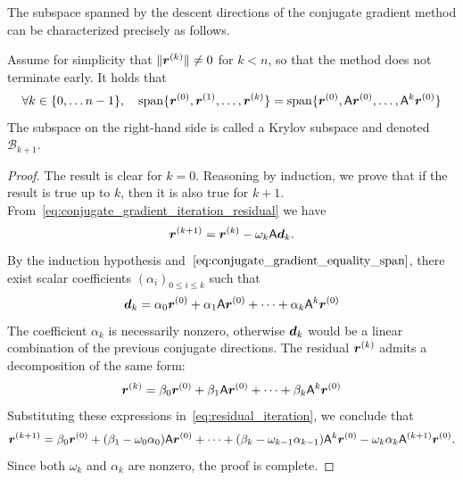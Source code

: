 The subspace spanned by the descent directions of the conjugate gradient method can be characterized precisely as follows.

\begin{proposition}
    \label{proposition:krylov_subspace}
    Assume for simplicity that $\lVert\mathbf{\boldsymbol{r}}^{(k)}\rVert \neq 0$ for $k < n$,
    so that the method does not terminate early.
    It holds that
    \[
        \forall k \in \{0, \dotsc n-1\}, \quad
        \operatorname{span}\{ \mathbf{\boldsymbol{r}}^{(0)}, \mathbf{\boldsymbol{r}}^{(1)}, \dotsc, \mathbf{\boldsymbol{r}}^{(k)} \}
        = \operatorname{span}\{ \mathbf{\boldsymbol{r}}^{(0)}, \mathsf A \mathbf{\boldsymbol{r}}^{(0)}, \dotsc, \mathsf A^k \mathbf{\boldsymbol{r}}^{(0)} \}
    \]
    The subspace on the right-hand side is called a Krylov subspace
    and denoted $\mathcal B_{k+1}$.
\end{proposition}
\begin{proof}
    The result is clear for $k = 0$.
    Reasoning by induction,
    we prove that if the result is true up to $k$,
    then it is also true for $k+1$.
    From~\eqref{eq:conjugate_gradient_iteration_residual} we have
    \begin{equation}
        \label{eq:residual_iteration}
        \mathbf{\boldsymbol{r}}^{(k+1)} = \mathbf{\boldsymbol{r}}^{(k)} - \omega_k \mathsf A \mathbf{\boldsymbol{d}}_k.
    \end{equation}
    By the induction hypothesis and~$\eqref{eq:conjugate_gradient_equality_span}$,
    there exist scalar coefficients $(\alpha_i)_{0\leq i \leq k}$ such that
    \[
        \mathbf{\boldsymbol{d}}_k = \alpha_0 \mathbf{\boldsymbol{r}}^{(0)} + \alpha_1 \mathsf A \mathbf{\boldsymbol{r}}^{(0)} + \dotsb + \alpha_{k} \mathsf A^k \mathbf{\boldsymbol{r}}^{(0)}
    \]
    The coefficient $\alpha_k$ is necessarily nonzero,
    otherwise $\mathbf{\boldsymbol{d}}_k$ would be a linear combination of the previous conjugate directions.
    The residual $\mathbf{\boldsymbol{r}}^{(k)}$ admits a decomposition of the same form:
    \[
        \mathbf{\boldsymbol{r}}^{(k)} = \beta_0 \mathbf{\boldsymbol{r}}^{(0)} + \beta_1 \mathsf A \mathbf{\boldsymbol{r}}^{(0)} + \dotsb + \beta_{k} \mathsf A^k \mathbf{\boldsymbol{r}}^{(0)}
    \]
    Substituting these expressions in~\eqref{eq:residual_iteration},
    we conclude that
    \[
        \mathbf{\boldsymbol{r}}^{(k+1)} = \beta_0 \mathbf{\boldsymbol{r}}^{(0)} + (\beta_1 - \omega_0 \alpha_0) \mathsf A \mathbf{\boldsymbol{r}}^{(0)}  + \dotsb + (\beta_k - \omega_{k-1} \alpha_{k-1}) \mathsf A^k \mathbf{\boldsymbol{r}}^{(0)} - \omega_k \alpha_k \mathsf A^{(k+1)} \mathbf{\boldsymbol{r}}^{(0)} .
    \]
    Since both $\omega_k$ and $\alpha_k$ are nonzero,
    the proof is complete.
\end{proof}

